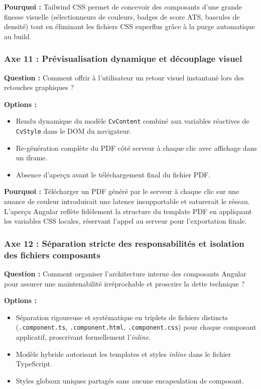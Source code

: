 \documentclass[11pt,a4paper]{article}
\begin{document}
\textbf{Pourquoi :} Tailwind CSS permet de concevoir des composants d'une grande finesse visuelle (sélectionneurs de couleurs, badges de score ATS, bascules de densité) tout en éliminant les fichiers CSS superflus grâce à la purge automatique au build.

\subsubsection{Axe 11 : Prévisualisation dynamique et découplage visuel}
\textbf{Question :} Comment offrir à l'utilisateur un retour visuel instantané lors des retouches graphiques ?

\textbf{Options :}
\begin{itemize}
    \item[$\boxtimes$] Rendu dynamique du modèle \texttt{CvContent} combiné aux variables réactives de \texttt{CvStyle} dans le DOM du navigateur.
    \item[$\square$] Re-génération complète du PDF côté serveur à chaque clic avec affichage dans un iframe.
    \item[$\square$] Absence d'aperçu avant le téléchargement final du fichier PDF.
\end{itemize}

\textbf{Pourquoi :} Télécharger un PDF généré par le serveur à chaque clic sur une nuance de couleur introduirait une latence insupportable et saturerait le réseau. L'aperçu Angular reflète fidèlement la structure du template PDF en appliquant les variables CSS locales, réservant l'appel au serveur pour l'exportation finale.

\subsubsection{Axe 12 : Séparation stricte des responsabilités et isolation des fichiers composants}
\textbf{Question :} Comment organiser l'architecture interne des composants Angular pour assurer une maintenabilité irréprochable et proscrire la dette technique ?

\textbf{Options :}
\begin{itemize}
    \item[$\boxtimes$] Séparation rigoureuse et systématique en triplets de fichiers distincts (\texttt{.component.ts}, \texttt{.component.html}, \texttt{.component.css}) pour chaque composant applicatif, proscrivant formellement l'\textit{inline}.
    \item[$\square$] Modèle hybride autorisant les templates et styles \textit{inline} dans le fichier TypeScript.
    \item[$\square$] Styles globaux uniques partagés sans aucune encapsulation de composant.
\end{itemize}
\end{document}

